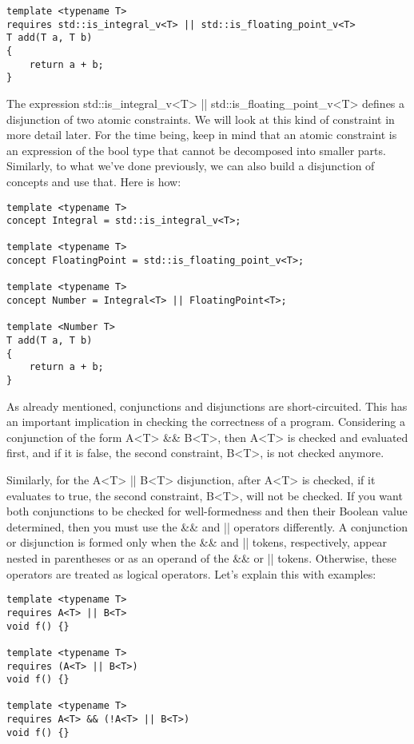 \begin{lstlisting}[style=styleCXX]
template <typename T>
requires std::is_integral_v<T> || std::is_floating_point_v<T>
T add(T a, T b)
{
	return a + b;
}
\end{lstlisting}

The expression std::is\_integral\_v<T> || std::is\_floating\_point\_v<T> defines a disjunction of two atomic constraints. We will look at this kind of constraint in more detail later. For the time being, keep in mind that an atomic constraint is an expression of the bool type that cannot be decomposed into smaller parts. Similarly, to what we’ve done previously, we can also build a disjunction of concepts and use that. Here is how:

\begin{lstlisting}[style=styleCXX]
template <typename T>
concept Integral = std::is_integral_v<T>;

template <typename T>
concept FloatingPoint = std::is_floating_point_v<T>;

template <typename T>
concept Number = Integral<T> || FloatingPoint<T>;

template <Number T>
T add(T a, T b)
{
	return a + b;
}
\end{lstlisting}

As already mentioned, conjunctions and disjunctions are short-circuited. This has an important implication in checking the correctness of a program. Considering a conjunction of the form A<T> \&\& B<T>, then A<T> is checked and evaluated first, and if it is false, the second constraint, B<T>, is not checked anymore.

Similarly, for the A<T> || B<T> disjunction, after A<T> is checked, if it evaluates to true, the second constraint, B<T>, will not be checked. If you want both conjunctions to be checked for well-formedness and then their Boolean value determined, then you must use the \&\& and || operators differently. A conjunction or disjunction is formed only when the \&\& and || tokens, respectively, appear nested in parentheses or as an operand of the \&\& or || tokens. Otherwise, these operators are treated as logical operators. Let’s explain this with examples:

\begin{lstlisting}[style=styleCXX]
template <typename T>
requires A<T> || B<T>
void f() {}

template <typename T>
requires (A<T> || B<T>)
void f() {}

template <typename T>
requires A<T> && (!A<T> || B<T>)
void f() {}
\end{lstlisting}

